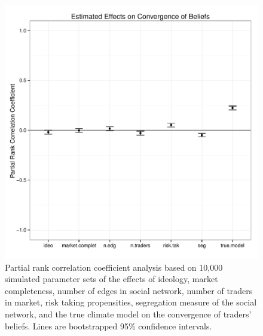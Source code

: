 \documentclass{article}\usepackage[]{graphicx}\usepackage[]{color}
\makeatletter
\def\maxwidth{ %
  \ifdim\Gin@nat@width>\linewidth
    \linewidth
  \else
    \Gin@nat@width
  \fi
}
\newenvironment{knitrout}{}{} %
\makeatother
\begin{document}
\begin{figure}[h]
\centering
\begin{knitrout}
\color{fgcolor}
\includegraphics[width=\maxwidth]{figure/pc_sa-1} 

\end{knitrout}
\caption{Partial rank correlation coefficient analysis based on 10,000 simulated parameter sets \cite{pujol_sensitivity:_2014,saltelli_sensitivity_2009} of the effects of ideology, market completeness, number of edges in social network, number of traders in market, risk taking propensities, segregation measure of the social network, and the true climate model on the convergence of traders' beliefs. Lines are bootstrapped 95\% confidence intervals.}
\label{fig:pc_sa}
\end{figure}
\end{document}
